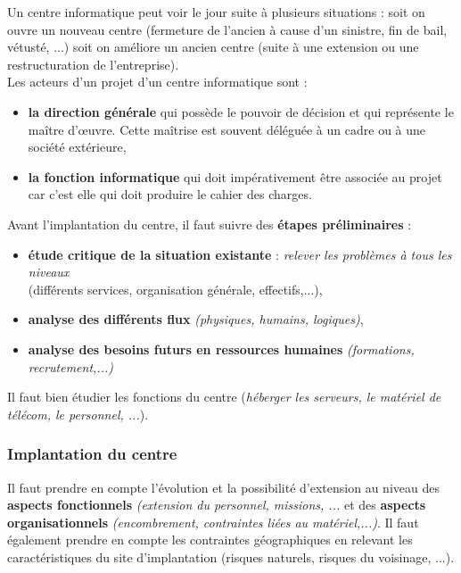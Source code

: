 \documentclass[10pt,a4paper,oneside,titlepage]{report}
\newcommand{\titre}[1]{\textcolor{title}{#1}}
\newcommand{\strong}[1]{\textbf{\titre{#1}}}
\begin{document}
Un centre informatique peut voir le jour suite à plusieurs situations : soit on ouvre un nouveau centre (fermeture de l'ancien à cause d'un sinistre, fin de bail, vétusté,
...) soit on améliore un ancien centre (suite à une extension ou une restructuration de l'entreprise). \\

\noindent Les acteurs d'un projet d'un centre informatique sont :
\begin{itemize}
\item \strong{la direction générale} qui possède le pouvoir de décision et qui représente le maître d'\oe uvre. Cette maîtrise est souvent déléguée à un cadre ou à une
société extérieure,
\item \strong{la fonction informatique} qui doit impérativement \^etre associée au projet car c'est elle qui doit produire le cahier des charges. \\
\end{itemize}

\noindent Avant l'implantation du centre, il faut suivre des \strong{étapes préliminaires} :
\begin{itemize}
\item \strong{étude critique de la situation existante} : \textit{relever les problèmes à tous les niveaux}\\(différents services, organisation générale, effectifs,...),
\item \strong{analyse des différents flux} \textit{(physiques, humains, logiques)},
\item \strong{analyse des besoins futurs en ressources humaines} \textit{(formations, recrutement,...)}
\end{itemize}

Il faut bien étudier les fonctions du centre (\textit{héberger les serveurs, le matériel de télécom, le personnel, ...}).

\subsubsection{Implantation du centre}

Il faut prendre en compte l'évolution et la possibilité d'extension au niveau des \strong{aspects fonctionnels} \textit{(extension du personnel, missions, ...} et des \strong{aspects organisationnels} \textit{(encombrement, contraintes liées au
matériel,...)}. Il faut également prendre en compte les contraintes géographiques en relevant les caractéristiques du site d'implantation (risques naturels, risques du voisinage, ...). \\
\end{document}
